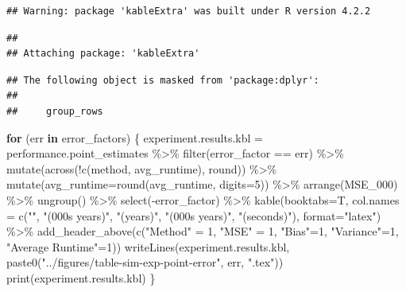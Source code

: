 \documentclass[
]{article}
\newenvironment{Shaded}{\begin{snugshade}}{\end{snugshade}}
\newcommand{\AttributeTok}[1]{\textcolor[rgb]{0.77,0.63,0.00}{#1}}
\newcommand{\ControlFlowTok}[1]{\textcolor[rgb]{0.13,0.29,0.53}{\textbf{#1}}}
\newcommand{\DecValTok}[1]{\textcolor[rgb]{0.00,0.00,0.81}{#1}}
\newcommand{\FunctionTok}[1]{\textcolor[rgb]{0.00,0.00,0.00}{#1}}
\newcommand{\NormalTok}[1]{#1}
\newcommand{\OtherTok}[1]{\textcolor[rgb]{0.56,0.35,0.01}{#1}}
\newcommand{\SpecialCharTok}[1]{\textcolor[rgb]{0.00,0.00,0.00}{#1}}
\newcommand{\StringTok}[1]{\textcolor[rgb]{0.31,0.60,0.02}{#1}}
\begin{document}
\begin{verbatim}
## Warning: package 'kableExtra' was built under R version 4.2.2
\end{verbatim}

\begin{verbatim}
## 
## Attaching package: 'kableExtra'
\end{verbatim}

\begin{verbatim}
## The following object is masked from 'package:dplyr':
## 
##     group_rows
\end{verbatim}

\begin{Shaded}
\begin{Highlighting}[]
\ControlFlowTok{for}\NormalTok{ (err }\ControlFlowTok{in}\NormalTok{ error\_factors) \{}
\NormalTok{  experiment.results.kbl }\OtherTok{=}\NormalTok{ performance.point\_estimates }\SpecialCharTok{\%\textgreater{}\%} 
    \FunctionTok{filter}\NormalTok{(error\_factor }\SpecialCharTok{==}\NormalTok{ err) }\SpecialCharTok{\%\textgreater{}\%} 
    \FunctionTok{mutate}\NormalTok{(}\FunctionTok{across}\NormalTok{(}\SpecialCharTok{!}\FunctionTok{c}\NormalTok{(method, avg\_runtime), round)) }\SpecialCharTok{\%\textgreater{}\%} 
    \FunctionTok{mutate}\NormalTok{(}\AttributeTok{avg\_runtime=}\FunctionTok{round}\NormalTok{(avg\_runtime, }\AttributeTok{digits=}\DecValTok{5}\NormalTok{)) }\SpecialCharTok{\%\textgreater{}\%}
    \FunctionTok{arrange}\NormalTok{(MSE\_000) }\SpecialCharTok{\%\textgreater{}\%}
    \FunctionTok{ungroup}\NormalTok{() }\SpecialCharTok{\%\textgreater{}\%}
    \FunctionTok{select}\NormalTok{(}\SpecialCharTok{{-}}\NormalTok{error\_factor) }\SpecialCharTok{\%\textgreater{}\%}
    \FunctionTok{kable}\NormalTok{(}\AttributeTok{booktabs=}\NormalTok{T, }\AttributeTok{col.names =} \FunctionTok{c}\NormalTok{(}\StringTok{""}\NormalTok{, }\StringTok{"(000\textquotesingle{}s years)"}\NormalTok{, }\StringTok{"(years)"}\NormalTok{, }\StringTok{"(000\textquotesingle{}s years)"}\NormalTok{, }\StringTok{"(seconds)"}\NormalTok{), }\AttributeTok{format=}\StringTok{"latex"}\NormalTok{) }\SpecialCharTok{\%\textgreater{}\%}
    \FunctionTok{add\_header\_above}\NormalTok{(}\FunctionTok{c}\NormalTok{(}\StringTok{"Method"} \OtherTok{=} \DecValTok{1}\NormalTok{, }\StringTok{"MSE"} \OtherTok{=} \DecValTok{1}\NormalTok{, }\StringTok{"Bias"}\OtherTok{=}\DecValTok{1}\NormalTok{, }\StringTok{"Variance"}\OtherTok{=}\DecValTok{1}\NormalTok{, }\StringTok{"Average Runtime"}\OtherTok{=}\DecValTok{1}\NormalTok{))}
  \FunctionTok{writeLines}\NormalTok{(experiment.results.kbl, }\FunctionTok{paste0}\NormalTok{(}\StringTok{"../figures/table{-}sim{-}exp{-}point{-}error"}\NormalTok{, err, }\StringTok{".tex"}\NormalTok{))}
  \FunctionTok{print}\NormalTok{(experiment.results.kbl)}
\NormalTok{\}}
\end{Highlighting}
\end{Shaded}
\end{document}
